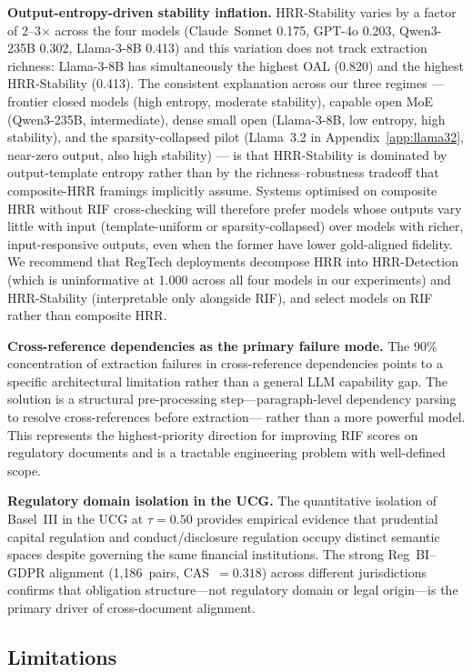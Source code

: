 \documentclass{article}
\begin{document}
\textbf{Output-entropy-driven stability inflation.}
HRR-Stability varies by a factor of 2--3$\times$ across the four
models (Claude~Sonnet 0.175, GPT-4o 0.203, Qwen3-235B 0.302,
Llama-3-8B 0.413) and this variation does not track extraction
richness: Llama-3-8B has simultaneously the highest OAL (0.820) and
the highest HRR-Stability (0.413). The consistent explanation
across our three regimes --- frontier closed models (high entropy,
moderate stability), capable open MoE (Qwen3-235B, intermediate),
dense small open (Llama-3-8B, low entropy, high stability), and the
sparsity-collapsed pilot (Llama~3.2 in Appendix~\ref{app:llama32},
near-zero output, also high stability) --- is that HRR-Stability is
dominated by output-template entropy rather than by the
richness--robustness tradeoff that composite-HRR framings
implicitly assume. Systems optimised on composite HRR without
RIF cross-checking will therefore prefer models whose outputs vary
little with input (template-uniform or sparsity-collapsed) over
models with richer, input-responsive outputs, even when the former
have lower gold-aligned fidelity. We recommend that RegTech
deployments decompose HRR into HRR-Detection (which is
uninformative at 1.000 across all four models in our experiments)
and HRR-Stability (interpretable only alongside RIF), and select
models on RIF rather than composite HRR.

\textbf{Cross-reference dependencies as the primary failure mode.}
The 90\% concentration of extraction failures in cross-reference
dependencies points to a specific architectural limitation rather than
a general LLM capability gap.
The solution is a structural pre-processing step---paragraph-level
dependency parsing to resolve cross-references before extraction---
rather than a more powerful model.
This represents the highest-priority direction for improving RIF scores
on regulatory documents and is a tractable engineering problem with
well-defined scope.

\textbf{Regulatory domain isolation in the UCG.}
The quantitative isolation of Basel~III in the UCG at $\tau=0.50$
provides empirical evidence that prudential capital regulation and
conduct/disclosure regulation occupy distinct semantic spaces despite
governing the same financial institutions.
The strong Reg~BI--GDPR alignment (1,186~pairs, CAS~$=0.318$) across
different jurisdictions confirms that obligation structure---not
regulatory domain or legal origin---is the primary driver of
cross-document alignment.

\subsection{Limitations}
\label{sec:limitations}
\end{document}
